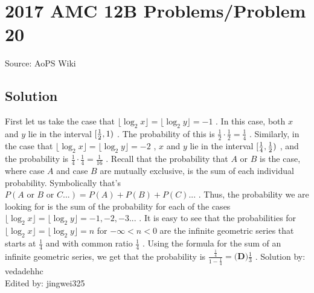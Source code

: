 \documentclass[12pt]{article}
\begin{document}
\section*{{2017 AMC 12B Problems/Problem 20}}
Source: AoPS Wiki

\subsection*{Solution}
First let us take the case that $\lfloor \log_2{x} \rfloor = \lfloor \log_2{y} \rfloor = -1$ . In this case, both $x$ and $y$ lie in the interval $[{1\over2}, 1)$ . The probability of this is $\frac{1}{2} \cdot \frac{1}{2} = \frac{1}{4}$ . Similarly, in the case that $\lfloor \log_2{x} \rfloor = \lfloor \log_2{y} \rfloor = -2$ , $x$ and $y$ lie in the interval $[{1\over4}, {1\over2})$ , and the probability is $\frac{1}{4} \cdot \frac{1}{4} = \frac{1}{16}$ . Recall that the probability that $A$ or $B$ is the case, where case $A$ and case $B$ are mutually exclusive, is the sum of each individual probability. Symbolically that's $P(A \text{ or } B \text{ or } C...) = P(A) + P(B) + P(C)...$ . Thus, the probability we are looking for is the sum of the probability for each of the cases $\lfloor \log_2{x} \rfloor = \lfloor \log_2{y} \rfloor = -1, -2, -3...$ . It is easy to see that the probabilities for $\lfloor \log_2{x} \rfloor = \lfloor \log_2{y} \rfloor = n$ for $-\infty < n < 0$ are the infinite geometric series that starts at $\frac{1}{4}$ and with common ratio $\frac{1}{4}$ . Using the formula for the sum of an infinite geometric series, we get that the probability is $\frac{\frac{1}{4}}{1 - \frac{1}{4}} = \boxed{\textbf{(D)}\frac{1}{3}}$ . Solution by: vedadehhc
\\ Edited by: jingwei325
\end{document}
